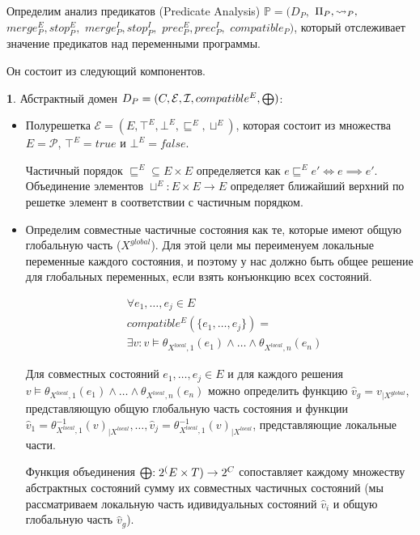 Определим анализ предикатов (Predicate Analysis) $\mathbb{P}=(D_{P},$ $\Pi_{P}, \leadsto_{P},$ $merge^E_{P}, stop^E_{P},$ $merge^I_{P}, stop^I_{P},$ $prec^E_{P},prec^I_{P},$ $compatible_{P})$, который отслеживает значение предикатов над переменными программы.

Он состоит из следующий компонентов.

{\textbf 1.} Абстрактный домен $D_{P}=(C, \mathcal{E}, \mathcal{I}, compatible^E, \mathrel{\bigoplus})$:

\begin{itemize}
\item Полурешетка
$\mathcal{E}=(E, \top^E, \bot^E, \sqsubseteq^E, \sqcup^E)$, которая состоит из множества
$E = \mathcal{P}$, 
$\top^E = true$ и $\bot^E = false$.

Частичный порядок $\sqsubseteq^E \subseteq E \times E$ определяется как $e \sqsubseteq^E e' \Leftrightarrow e \implies e'$.
Объединение элементов $\sqcup^E: E \times E \to E$ определяет ближайший верхний по решетке элемент в соответствии с частичным порядком.

\item
Определим совместные частичные состояния как те, которые имеют общую глобальную часть ($X^{global}$).
Для этой цели мы переименуем локальные переменные каждого состояния, и поэтому у нас должно быть общее решение для глобальных переменных, если взять конъюнкцию всех состояний.

\begin{equation}
\begin{aligned}
& \forall e_1, \dots, e_j \in E \\
& compatible^E(\{e_1,\dots, e_j\}) = \\
& \exists v: v \models \theta_{X^{local},1}(e_1) \land \dots \land \theta_{X^{local},n}(e_n)
\end{aligned}
\end{equation}

Для совместных состояний $e_1, \dots, e_j \in E$ и для каждого решения 
$v \models \theta_{X^{local},1}(e_1) \land \dots \land \theta_{X^{local},n}(e_n)$
можно определить функцию $\hat v_g = v_{\mid X^{global}}$, представляющую общую глобальную часть состояния и функции $\hat v_1=\theta_{X^{local},1}^{-1}(v)_{\mid X^{local}}, \dots, \hat v_j=\theta_{X^{local},1}^{-1}(v)_{\mid X^{local}}$, представляющие локальные части.

Функция объединения $\mathrel{\bigoplus}: 2^(E \times T) \to 2^C$ сопоставляет каждому множеству абстрактных состояний сумму их совместных частичных состояний (мы рассматриваем локальную часть идивидуальных состояний $\hat v_i$ и общую глобальную часть $\hat v_g$).


\end{itemize}
